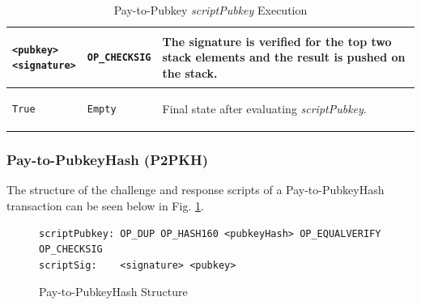 \begin{table}
\begin{minipage}{\textwidth}
\begin{tabular}{| m{95pt} | m{145pt} | m{100pt} |}
\vspace{8pt}
\begin{BVerbatim}[fontsize==\relsize{-4}]
<pubkey>
<signature>
\end{BVerbatim}
\vspace{4pt}
&
\vspace{8pt}
\begin{BVerbatim}[fontsize==\relsize{-4}]
OP_CHECKSIG
\end{BVerbatim} 
\vspace{4pt}
&
The signature is verified for the top two stack elements and the result is pushed on the stack.\\ \hline	


\vspace{8pt}
\begin{BVerbatim}[fontsize==\relsize{-4}]
True
\end{BVerbatim}
\vspace{4pt}
&
\vspace{8pt}
\begin{BVerbatim}[fontsize==\relsize{-4}]
Empty
\end{BVerbatim} 
\vspace{4pt}
&
Final state after evaluating \textit{scriptPubkey}. \\ \hline

\end{tabular}
\vspace{5pt}
\caption{Pay-to-Pubkey \textit{scriptPubkey} Execution}
\label{tab:P2Pub2}

\end{minipage}
\end{table}

\noindent
\subsubsection{Pay-to-PubkeyHash (P2PKH)} \label{sec:P2PKH}
The structure of the challenge and response scripts of a Pay-to-PubkeyHash transaction can be seen below in Fig. \ref{fig:P2PubHashStructure}.

\vspace{-10pt}
\begin{figure}[htbp]

\begin{Verbatim}[fontsize==\relsize{-4}, frame=single]  
scriptPubkey: OP_DUP OP_HASH160 <pubkeyHash> OP_EQUALVERIFY OP_CHECKSIG
scriptSig:    <signature> <pubkey>	
\end{Verbatim}

\vspace{-15pt}
\caption{Pay-to-PubkeyHash Structure}
\label{fig:P2PubHashStructure}
\end{figure}
\vspace{-10pt}

